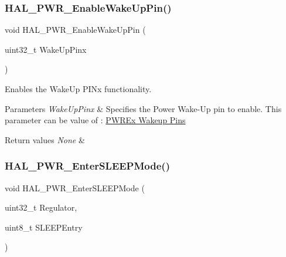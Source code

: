 \subsubsection{\texorpdfstring{H\+A\+L\+\_\+\+P\+W\+R\+\_\+\+Enable\+Wake\+Up\+Pin()}{HAL\_PWR\_EnableWakeUpPin()}}
{\footnotesize\ttfamily void H\+A\+L\+\_\+\+P\+W\+R\+\_\+\+Enable\+Wake\+Up\+Pin (\begin{DoxyParamCaption}\item[{uint32\+\_\+t}]{Wake\+Up\+Pinx }\end{DoxyParamCaption})}



Enables the Wake\+Up P\+I\+Nx functionality. 


\begin{DoxyParams}{Parameters}
{\em Wake\+Up\+Pinx} & Specifies the Power Wake-\/\+Up pin to enable. This parameter can be value of \+: \hyperlink{group___p_w_r_ex___wake_up___pins}{P\+W\+R\+Ex Wakeup Pins} \\
\hline
\end{DoxyParams}

\begin{DoxyRetVals}{Return values}
{\em None} & \\
\hline
\end{DoxyRetVals}
\mbox{\label{group___p_w_r___exported___functions___group2_ga5c84f4e046525c22d233c8a3443fab5f}} 
\subsubsection{\texorpdfstring{H\+A\+L\+\_\+\+P\+W\+R\+\_\+\+Enter\+S\+L\+E\+E\+P\+Mode()}{HAL\_PWR\_EnterSLEEPMode()}}
{\footnotesize\ttfamily void H\+A\+L\+\_\+\+P\+W\+R\+\_\+\+Enter\+S\+L\+E\+E\+P\+Mode (\begin{DoxyParamCaption}\item[{uint32\+\_\+t}]{Regulator,  }\item[{uint8\+\_\+t}]{S\+L\+E\+E\+P\+Entry }\end{DoxyParamCaption})}



